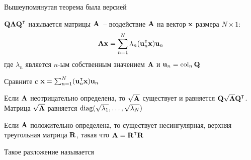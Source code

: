 \begin{frame}

   \vspace{2em}

    Вышеупомянутая теорема была версией 

    $\boldQ \boldLambda \boldQ^\T$ называется  матрицы $\mathbf A$\ -- воздействие $\mathbf A$ на вектор ${\mathbf x}$ 
    размера $N \times 1$:
    \begin{equation*}
        \boldA\boldx = \sum_{n=1}^N \lambda_n (\boldu_n^\T \boldx) \boldu_n
    \end{equation*}
    где $\lambda_n$ является $n$-ым собственным значением $\mathbf A$ и ${\mathbf u}_n = \operatorname{col}_n \mathbf Q$
    
    \vspace{.7em}
    Сравните с $\boldx = \sum_{n=1}^N (\boldu_n^\T \boldx) \boldu_n$
    
\end{frame}

\begin{frame}

    \vspace{2em}
    \Fact{\eqref{ET-fa:sqrtsnd}}
    Если $\mathbf A$ неотрицательно определена, то $\sqrt{\mathbf A}$
    существует и равняется $\boldQ \sqrt{\boldLambda} \boldQ^\T$.
    Матрица $\sqrt{{\boldsymbol \Lambda}}$ равняется $\operatorname{diag}(\sqrt{\lambda_1},
    \ldots, \sqrt{\lambda_N})$
    
    \vspace{.7em}
    \Fact{\eqref{ET-fa:cholesky}}
    Если $\mathbf A$ положительно определена, то существует несингулярная, верхняя
    треугольная матрица $\mathbf R$, такая что $\boldA = \boldR^\T \boldR$
    
    Такое разложение называется 

\end{frame}

